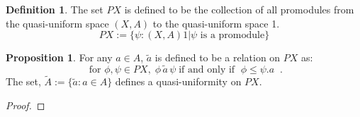\documentclass[a4paper]{article}
\makeatletter
\theoremstyle{definition}
\newtheorem{definition}[theorem]{Definition}
\newtheorem{prop}[theorem]{Proposition}
\newcommand{\carrow}{}%
\DeclareRobustCommand{\carrow}{%
	\mathrel{\vphantom{\rightarrow}\mathpalette\circle@arrow\relax}%
}
\newcommand{\circle@arrow}[2]{%
	\m@th
	\ooalign{%
		\hidewidth$#1\circ\mkern1mu$\hidewidth\cr
	$#1\longrightarrow$\cr}%
}
\makeatother
\begin{document}
\begin{definition}%
	The set $PX$ is defined to be the collection of all promodules from the
	quasi-uniform space $(X,A)$ to the quasi-uniform space 1.
	\[PX:=\{\psi :(X,A) \carrow 1 | \psi \text{ is a promodule} \}\]
\end{definition}
\begin{prop}%
	For any $a\in A$, $\tilde{a}$ is defined to be a relation on $PX$ as:
	\[ \text{ for } \phi,\psi \in PX, \; \phi \, \tilde{a} \, \psi \; \text{if and only if } \;	\phi \leq \psi.a \; \;.\]
	The set, $\tilde{A}:=\{\tilde{a}:a \in A\}$ defines a quasi-uniformity on $PX$.
\end{prop}
\begin{proof}\setcounter{equation}{0}


\end{proof}
\end{document}

